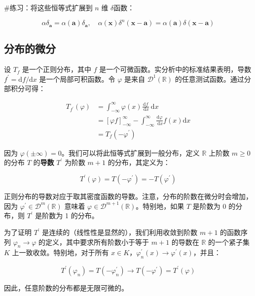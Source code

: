 \#练习：将这些恒等式扩展到 \(n\) 维 $\delta$函数：

\[
\alpha \delta_{\mathbf{a}} = \alpha(\mathbf{a}) \delta_{\mathbf{a}}, \quad \alpha(\mathbf{x}) \delta^n(\mathbf{x} - \mathbf{a}) = \alpha(\mathbf{a}) \delta(\mathbf{x} - \mathbf{a})
\]

\subsection{分布的微分}\label{ux5206ux5e03ux7684ux5faeux5206}

设 \(T_f\) 是一个正则分布，其中 \(f\)
是一个可微函数。实分析中的标准结果表明，导数
\(f^{\prime} = \mathrm{d}f / \mathrm{d}x\) 是一个局部可积函数。令
\(\varphi\) 是来自 \(\mathcal{D}^1(\mathbb{R})\)
的任意测试函数。通过分部积分可得：

\[
\begin{aligned}
T_{f^{\prime}}(\varphi) & = \int_{-\infty}^\infty \varphi(x) \frac{\mathrm{d}f}{\mathrm{~d}x} \mathrm{~d}x \\
& = [\varphi f]_{-\infty}^\infty - \int_{-\infty}^\infty \frac{\mathrm{d}\varphi}{\mathrm{~d}x} f(x) \mathrm{d}x \\
& = T_f\left(-\varphi^{\prime}\right)
\end{aligned}
\]

因为 \(\varphi(\pm \infty) = 0\)。我们可以将此恒等式扩展到一般分布，定义
\(\mathbb{R}\) 上阶数 \(m \geq 0\) 的分布 \(T\) 的\textbf{导数}
\(T^{\prime}\) 为阶数 \(m+1\) 的分布，其定义为：

\[
T^{\prime}(\varphi) = T\left(-\varphi^{\prime}\right) = -T\left(\varphi^{\prime}\right)
\]

正则分布的导数对应于取其密度函数的导数。注意，分布的阶数在微分时会增加，因为
\(\varphi^{\prime} \in \mathcal{D}^m(\mathbb{R})\) 意味着
\(\varphi \in \mathcal{D}^{m+1}(\mathbb{R})\)。特别地，如果 \(T\)
是阶数为 0 的分布，则 \(T^{\prime}\) 是阶数为 1 的分布。

为了证明 \(T^{\prime}\) 是连续的（线性性是显然的），我们利用收敛到阶数
\(m+1\) 的函数序列 \(\varphi_n \to \varphi\)
的定义，其中要求所有阶数小于等于 \(m+1\) 的导数在 \(\mathbb{R}\)
的一个紧子集 \(K\) 上一致收敛。特别地，对于所有
\(x \in K\)，\(\varphi_n^{\prime}(x) \to \varphi^{\prime}(x)\)，并且：

\[
T^{\prime}(\varphi_n) = T\left(-\varphi_n^{\prime}\right) \to T\left(-\varphi^{\prime}\right) = T^{\prime}(\varphi)
\]

因此，任意阶数的分布都是无限可微的。

